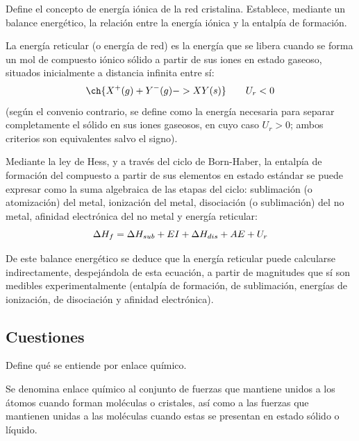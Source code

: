\begin{exercise}
    Define el concepto de energía iónica de la red cristalina.
    Establece, mediante un balance energético, la relación
    entre la energía iónica y la entalpía de formación.
    \begin{solu}

        La energía reticular (o energía de red) es la energía que se libera cuando se forma un mol de compuesto iónico sólido a partir de sus iones en estado gaseoso, situados inicialmente a distancia infinita entre sí:
        \[
            \ch{X^{+}(g) + Y^{-}(g) -> XY(s)} \qquad U_r < 0
        \]
        (según el convenio contrario, se define como la energía necesaria para separar completamente el sólido en sus iones gaseosos, en cuyo caso \(U_r>0\); ambos criterios son equivalentes salvo el signo).

        Mediante la ley de Hess, y a través del ciclo de Born-Haber, la entalpía de formación del compuesto a partir de sus elementos en estado estándar se puede expresar como la suma algebraica de las etapas del ciclo: sublimación (o atomización) del metal, ionización del metal, disociación (o sublimación) del no metal, afinidad electrónica del no metal y energía reticular:
        \[
            \Delta H_{f} = \Delta H_{sub} + EI + \Delta H_{dis} + AE + U_r
        \]

        De este balance energético se deduce que la energía reticular puede calcularse indirectamente, despejándola de esta ecuación, a partir de magnitudes que sí son medibles experimentalmente (entalpía de formación, de sublimación, energías de ionización, de disociación y afinidad electrónica).
    \end{solu}
\end{exercise}







\subsection{Cuestiones}
\begin{question}
    Define qué se entiende por enlace químico.
    \begin{solu}
        Se denomina enlace químico al conjunto de fuerzas que mantiene
        unidos a los átomos cuando forman moléculas o cristales,
        así como a las fuerzas que mantienen unidas a las moléculas
        cuando estas se presentan en estado sólido o líquido.
    \end{solu}
\end{question}



